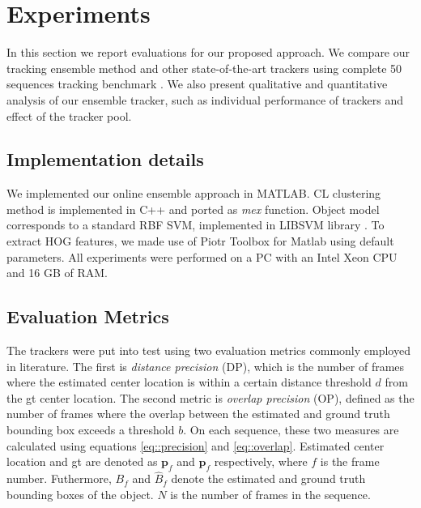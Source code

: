 \chapter{Experiments} %

\label{chapter4} %

\label{chapter::experiments}

In this section we report evaluations for our proposed approach. We compare our
tracking ensemble method and other state-of-the-art trackers using complete
50 sequences tracking benchmark \cite{Wu2013B}. We also present qualitative and
quantitative analysis of our ensemble tracker, such as
individual performance of trackers and effect of the tracker pool.

\section{Implementation details}
We implemented our online ensemble approach in MATLAB. CL clustering method is
implemented in C++ and ported as \textit{mex} function. Object model corresponds
to a standard RBF SVM, implemented in LIBSVM library \cite{libsvm}. To extract
HOG features, we made use of Piotr Toolbox for Matlab \cite{PMT} using default parameters. All experiments were performed on a PC with an Intel Xeon CPU and 16 GB of RAM.

\section{Evaluation Metrics}
The trackers were put into test using two evaluation metrics commonly employed in
literature. The first is \textit{distance precision} (DP), which is the number
of frames where the estimated center location is within a certain distance
threshold $d$ from the \gls{gt} center location. The second metric is
\textit{overlap precision} (OP), defined as the number of frames where the
overlap between the estimated and ground truth bounding box exceeds
a threshold $b$. On each sequence, these two measures are calculated using
equations \ref{eq::precision} and \ref{eq::overlap}. Estimated center location
and \gls{gt} are denoted as $\mathbf{p}_f$ and $\mathbf{\hat{p}}_f$
respectively, where $f$ is the frame number. Futhermore, $B_f$ and $\hat{B}_f$
denote the estimated and ground truth bounding boxes of the object. $N$ is the
number of frames in the sequence.

